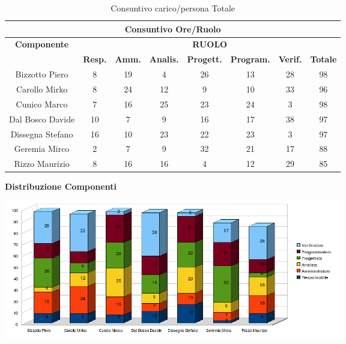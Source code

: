 \newpage
\begin{table}[!h]
	\begin{center}
		  \begin{tabular}
			  {|c|c|c|c|c|c|c|c|}
		 \hline
			\multicolumn{8}{|c|}{ \textbf{Consuntivo Ore/Ruolo} } \\
			\hline
			\textbf{Componente} & \multicolumn{7}{|c|}{ \textbf{RUOLO} } \\
			\hline
			& \textbf{Resp.} & \textbf{Amm.} & \textbf{Analis.} & \textbf{Progett.} & \textbf{Program.} & \textbf{Verif.}  & \textbf{Totale}\\
			\hline
			Bizzotto Piero 		&  8  &  19  &  4  &  26  &  13 &  28 &  98 \\ %
			\hline
			Carollo Mirko 		&  8  &  24  &  12 &  9  &  10 &  33 &  96\\ %
			\hline
			Cunico Marco    	&  7  &  16 &  25  &  23 &  24 &  3  &  98\\ %
			\hline
			Dal Bosco Davide   	&  10  &  7  &  9  &  16 &  17 &  38 &  97\\ %
			\hline
			Dissegna Stefano    &  16  &  10 &  23  &  22 &  23 &  3  &  97\\ %
			\hline
			Geremia Mirco   	&  2  &  7  &  9  &  32 &  21 &  17  &  88\\ %
			\hline	
			Rizzo Maurizio  	&  8  &  16 &  16  &  4  &  12 &  29  &  85\\ %
			\hline	
		\end{tabular}
	\caption{Consuntivo carico/persona Totale} %
	\label{tab: ConsPersOre_Totale}
	\end{center}	
\end{table}

\begin{center}\textbf{Distribuzione Componenti}
\end{center}
\includegraphics[width=420pt]{Cons}



